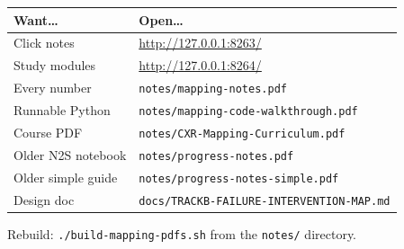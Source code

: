 \documentclass[11pt,a4paper]{article}
\begin{document}
\begin{center}
\begin{tabular}{@{}ll@{}}
\toprule
\textbf{Want\ldots} & \textbf{Open\ldots} \\
\midrule
Click notes & \url{http://127.0.0.1:8263/} \\
Study modules & \url{http://127.0.0.1:8264/} \\
Every number & \texttt{notes/mapping-notes.pdf} \\
Runnable Python & \texttt{notes/mapping-code-walkthrough.pdf} \\
Course PDF & \texttt{notes/CXR-Mapping-Curriculum.pdf} \\
Older N2S notebook & \texttt{notes/progress-notes.pdf} \\
Older simple guide & \texttt{notes/progress-notes-simple.pdf} \\
Design doc & \texttt{docs/TRACKB-FAILURE-INTERVENTION-MAP.md} \\
\bottomrule
\end{tabular}
\end{center}

\vspace{1em}
\begin{center}
\color{muted}\small
Rebuild: \texttt{./build-mapping-pdfs.sh} from the \texttt{notes/} directory.
\end{center}
\end{document}
